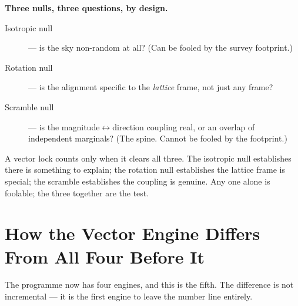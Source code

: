 \documentclass[11pt, letterpaper, openany]{book}
\begin{document}
\begin{signalbox}
\textbf{Three nulls, three questions, by design.}
\begin{description}
  \item[Isotropic null] --- is the sky non-random at all? (Can be fooled by the survey footprint.)
  \item[Rotation null] --- is the alignment specific to the \emph{lattice} frame, not just any frame?
  \item[Scramble null] --- is the magnitude$\leftrightarrow$direction coupling real, or an overlap of
        independent marginals? (The spine. Cannot be fooled by the footprint.)
\end{description}
A vector lock counts only when it clears all three. The isotropic null establishes there is something to
explain; the rotation null establishes the lattice frame is special; the scramble establishes the coupling is
genuine. Any one alone is foolable; the three together are the test.
\end{signalbox}

\chapter{How the Vector Engine Differs From All Four Before It}

The programme now has four engines, and this is the fifth. The difference is not incremental --- it is the
first engine to leave the number line entirely.
\end{document}
